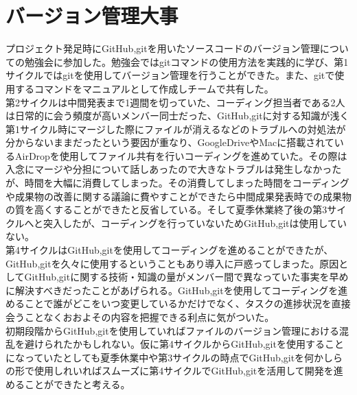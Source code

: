 \section{バージョン管理大事}
プロジェクト発足時にGitHub,gitを用いたソースコードのバージョン管理についての勉強会に参加した。勉強会ではgitコマンドの使用方法を実践的に学び、第1サイクルではgitを使用してバージョン管理を行うことができた。また、gitで使用するコマンドをマニュアルとして作成しチームで共有した。\\
第2サイクルは中間発表まで1週間を切っていた、コーディング担当者である2人は日常的に会う頻度が高いメンバー同士だった、GitHub,gitに対する知識が浅く第1サイクル時にマージした際にファイルが消えるなどのトラブルへの対処法が分からないままだったという要因が重なり、GoogleDriveやMacに搭載されているAirDropを使用してファイル共有を行いコーディングを進めていた。その際は入念にマージや分担について話しあったので大きなトラブルは発生しなかったが、時間を大幅に消費してしまった。その消費してしまった時間をコーディングや成果物の改善に関する議論に費やすことができたら中間成果発表時での成果物の質を高くすることができたと反省している。そして夏季休業終了後の第3サイクルへと突入したが、コーディングを行っていないためGitHub,gitは使用していない。\\
第4サイクルはGitHub,gitを使用してコーディングを進めることができたが、GitHub,gitを久々に使用するということもあり導入に戸惑ってしまった。原因としてGitHub,gitに関する技術・知識の量がメンバー間で異なっていた事実を早めに解決すべきだったことがあげられる。GitHub,gitを使用してコーディングを進めることで誰がどこをいつ変更しているかだけでなく、タスクの進捗状況を直接会うことなくおおよその内容を把握できる利点に気がついた。\\
初期段階からGitHub,gitを使用していればファイルのバージョン管理における混乱を避けられたかもしれない。仮に第4サイクルからGitHub,gitを使用することになっていたとしても夏季休業中や第3サイクルの時点でGitHub,gitを何かしらの形で使用しれいればスムーズに第4サイクルでGitHub,gitを活用して開発を進めることができたと考える。
